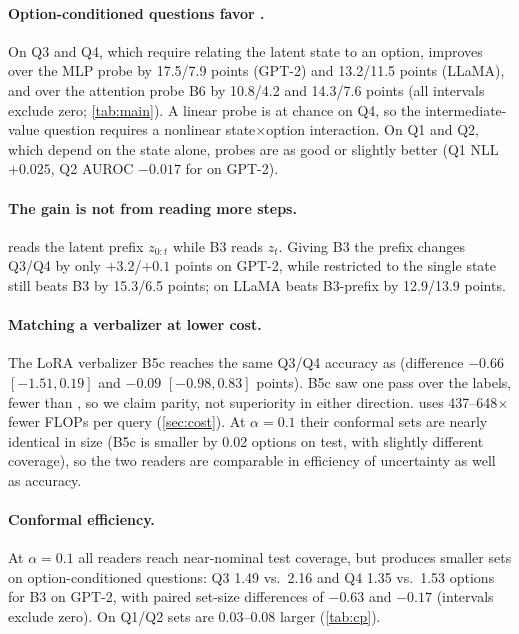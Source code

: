 \paragraph{Option-conditioned questions favor \clr{}.} On Q3 and Q4, which require relating the latent state to an option, \clr{} improves over the MLP probe by 17.5/7.9 points (GPT-2) and 13.2/11.5 points (LLaMA), and over the attention probe B6 by 10.8/4.2 and 14.3/7.6 points (all intervals exclude zero; \cref{tab:main}). A linear probe is at chance on Q4, so the intermediate-value question requires a nonlinear state$\times$option interaction. On Q1 and Q2, which depend on the state alone, probes are as good or slightly better (Q1 NLL $+0.025$, Q2 AUROC $-0.017$ for \clr{} on GPT-2).

\paragraph{The gain is not from reading more steps.} \clr{} reads the latent prefix $z_{0:t}$ while B3 reads $z_t$. Giving B3 the prefix changes Q3/Q4 by only $+3.2$/$+0.1$ points on GPT-2, while \clr{} restricted to the single state still beats B3 by 15.3/6.5 points; on LLaMA \clr{} beats B3-prefix by 12.9/13.9 points.

\paragraph{Matching a verbalizer at lower cost.} The LoRA verbalizer B5c reaches the same Q3/Q4 accuracy as \clr{} (difference $-0.66$ $[-1.51, 0.19]$ and $-0.09$ $[-0.98, 0.83]$ points). B5c saw one pass over the labels, fewer than \clr{}, so we claim parity, not superiority in either direction. \clr{} uses 437--648$\times$ fewer FLOPs per query (\cref{sec:cost}). At $\alpha=0.1$ their conformal sets are nearly identical in size (B5c is smaller by 0.02 options on test, with slightly different coverage), so the two readers are comparable in efficiency of uncertainty as well as accuracy.

\paragraph{Conformal efficiency.} At $\alpha=0.1$ all readers reach near-nominal test coverage, but \clr{} produces smaller sets on option-conditioned questions: Q3 1.49 vs.\ 2.16 and Q4 1.35 vs.\ 1.53 options for B3 on GPT-2, with paired set-size differences of $-0.63$ and $-0.17$ (intervals exclude zero). On Q1/Q2 sets are 0.03--0.08 larger (\cref{tab:cp}).

